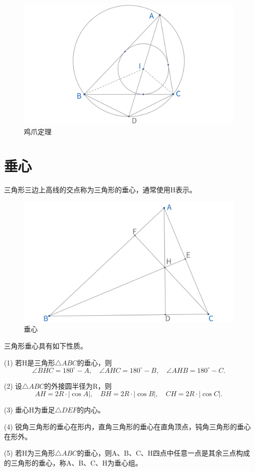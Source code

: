 \begin{figure}[H]
    \centering
    \includegraphics[width=\linewidth]{figures/三角形五心/鸡爪定理.png}
    \caption{鸡爪定理}
\end{figure}





\newpage
\section{垂心}
\begin{definition}[垂心]
    三角形三边上高线的交点称为三角形的垂心，通常使用H表示。
\end{definition}

\begin{figure}[H]
    \centering
    \includegraphics[width=0.8\linewidth]{figures/三角形五心/垂心.png}
    \caption{垂心}
\end{figure}

\begin{proposition}[垂心性质]
    三角形垂心具有如下性质。

    (1) 若H是三角形$\triangle ABC$的垂心，则
    $$\angle BHC = 180^\circ - A,\quad \angle AHC = 180^\circ - B,\quad \angle AHB =180^\circ - C.$$

    (2) 设$\triangle ABC$的外接圆半径为R，则
    $$AH=2R\cdot |\cos A|,\quad
    BH=2R\cdot |\cos B|,\quad
    CH=2R\cdot |\cos C|.$$

    (3) 垂心H为垂足$\triangle DEF$的内心。


    (4) 锐角三角形的垂心在形内，直角三角形的垂心在直角顶点，钝角三角形的垂心在形外。

    (5) 若H为三角形$\triangle ABC$的垂心，则A、B、C、H四点中任意一点是其余三点构成的三角形的垂心，称A、B、C、H为垂心组。
\end{proposition}


